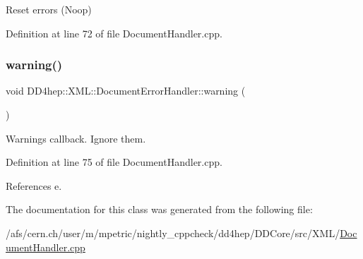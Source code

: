 Reset errors (Noop) 



Definition at line 72 of file Document\+Handler.\+cpp.

\hypertarget{class_d_d4hep_1_1_x_m_l_1_1_document_error_handler_aea72a4df771def82a559fb89bee54489}{}\label{class_d_d4hep_1_1_x_m_l_1_1_document_error_handler_aea72a4df771def82a559fb89bee54489} 
\subsubsection{\texorpdfstring{warning()}{warning()}}
{\footnotesize\ttfamily void D\+D4hep\+::\+X\+M\+L\+::\+Document\+Error\+Handler\+::warning (\begin{DoxyParamCaption}\item[{const S\+A\+X\+Parse\+Exception \&}]{ }\end{DoxyParamCaption})\hspace{0.3cm}{\ttfamily [inline]}}



Warnings callback. Ignore them. 



Definition at line 75 of file Document\+Handler.\+cpp.



References e.



The documentation for this class was generated from the following file\+:\begin{DoxyCompactItemize}
\item 
/afs/cern.\+ch/user/m/mpetric/nightly\+\_\+cppcheck/dd4hep/\+D\+D\+Core/src/\+X\+M\+L/\hyperlink{_document_handler_8cpp}{Document\+Handler.\+cpp}\end{DoxyCompactItemize}
